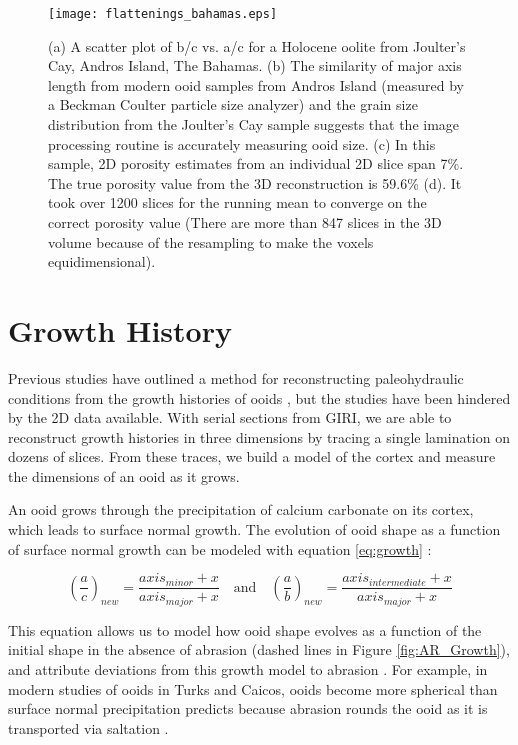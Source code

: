 \documentclass[draft]{agujournal2019}
\begin{document}
\begin{figure}
    \centering
    \texttt{[image: flattenings\_bahamas.eps]}
    \caption{(a) A scatter plot of b/c vs. a/c for a Holocene oolite from Joulter's Cay, Andros Island, The Bahamas. (b) The similarity of major axis length from modern ooid samples from Andros Island (measured by a Beckman Coulter particle size analyzer) and the grain size distribution from the Joulter's Cay sample suggests that the image processing routine is accurately measuring ooid size. (c) In this sample, 2D porosity estimates from an individual 2D slice span 7\%. The true porosity value from the 3D reconstruction is 59.6\% (d). It took over 1200 slices for the running mean to converge on the correct porosity value (There are more than 847 slices in the 3D volume because of the resampling to make the voxels equidimensional).}
    \label{fig:2D_Hist}
\end{figure}




\section{Growth History}
Previous studies have outlined a method for reconstructing paleohydraulic conditions from the growth histories of ooids \cite{heller1980transport,sipos2018shape}, but the studies have been hindered by the 2D data available. With serial sections from GIRI, we are able to reconstruct growth histories in three dimensions by tracing a single lamination on dozens of slices. From these traces, we build a model of the cortex and measure the dimensions of an ooid as it grows. 

An ooid grows through the precipitation of calcium carbonate on its cortex, which leads to surface normal growth. The evolution of ooid shape as a function of surface normal growth can be modeled with equation \ref{eq:growth} \cite{ trower2018active}: 

\begin{equation}
    \left(\frac{a}{c}\right)_{new} = \frac{axis_{minor}  + x}{axis_{major} + x}  \quad\text{and}\quad \left(\frac{a}{b}\right)_{new} = \frac{axis_{intermediate}  + x}{axis_{major} + x}
    \label{eq:growth}
\end{equation}



This equation allows us to model how ooid shape evolves as a function of the initial shape in the absence of abrasion (dashed lines in Figure \ref{fig:AR_Growth}), and attribute deviations from this growth model to abrasion \cite{trower2018active}. For example, in modern studies of ooids in Turks and Caicos, ooids become more spherical than surface normal precipitation predicts because abrasion rounds the ooid as it is transported via saltation \cite{trower2018active}. 
\end{document}
